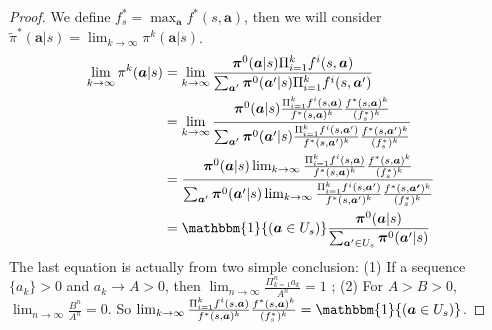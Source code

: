\documentclass{article}
\begin{document}
\begin{proof}
	    We define $f^*_s = \max_{\bm{a}} f^*(s,\bm{a})$, then we will consider $\tilde{\pi}^*(\bm{a}|s) = \lim_{k \to \infty} \pi^k(\bm{a}|s)$.
	    \begin{align*}
	        \lim_{k \to \infty} \pi^k(\bm{a}|s) & = \lim_{k \to \infty} 
	        \frac{  
	        \bm{\pi}^{0}(\bm{a}|s) \Pi_{i = 1}^{k}f^i(s,\bm{a}) 
	        }
	        {
	        \sum_{\bm{a}^\prime} \bm{\pi}^{0}(\bm{a}^\prime|s) \Pi_{i = 1}^{k}f^i(s,\bm{a}^\prime) 
	        } \\
	        & = \lim_{k \to \infty}
	        \frac{  
	        \bm{\pi}^{0}(\bm{a}|s) 
	            \frac{
    	            \Pi_{i = 1}^{k}f^i(s,\bm{a}) }{f^*(s,\bm{a})^k}
    	       \frac{f^*(s,\bm{a})^k}{(f^*_s)^k}
	        }
	        {
	        \sum_{\bm{a}^\prime} \bm{\pi}^{0}(\bm{a}^\prime|s) 
	            \frac{
    	            \Pi_{i = 1}^{k}f^i(s,\bm{a}^\prime) }{f^*(s,\bm{a}^\prime)^k}
    	       \frac{f^*(s,\bm{a}^\prime)^k}{(f^*_s)^k}
	        } \\
	        & = \frac
	            {
	                \bm{\pi}^{0}(\bm{a}|s)
	                 \lim_{k \to \infty}
	                \frac{
    	            \Pi_{i = 1}^{k}f^i(s,\bm{a}) }{f^*(s,\bm{a})^k}
    	            \frac{f^*(s,\bm{a})^k}{(f^*_s)^k}
	            }
	            {
	                \sum_{\bm{a}^\prime}
	                \bm{\pi}^{0}(\bm{a}^\prime|s)
	                 \lim_{k \to \infty}
	                \frac{
    	            \Pi_{i = 1}^{k}f^i(s,\bm{a}^\prime) }{f^*(s,\bm{a}^\prime)^k}
    	            \frac{f^*(s,\bm{a^\prime})^k}{(f^*_s)^k}
	            } \\
	       & = \mathbbm{1}{(\bm{a} \in U_s)} \frac{\bm{\pi}^0(\bm{a}|s)}{\sum_{\bm{a}^\prime \in U_s}\bm{\pi}^0(\bm{a}^\prime|s)}
	    \end{align*}
	    The last equation is actually from two simple conclusion: (1) If a sequence $\{a_k\} >0 $ and $a_k \to A > 0$, then $\lim_{n \to \infty} \frac{\Pi_{k = 1}^na_k}{A^n} = 1$ ; (2) For $A > B > 0$,  $\lim_{n \to \infty} \frac{B^n}{A^n} = 0$. So $\lim_{k \to \infty}
	                \frac{
    	            \Pi_{i = 1}^{k}f^i(s,\bm{a}) }{f^*(s,\bm{a})^k}
    	            \frac{f^*(s,\bm{a})^k}{(f^*_s)^k} = \mathbbm{1}{(\bm{a} \in U_s)} $. 
	\end{proof}


	
\end{document}
